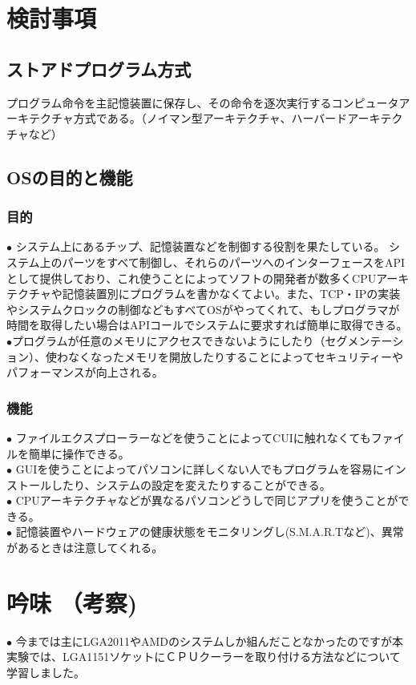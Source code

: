 \documentclass[10pt]{article}
\begin{document}
\section{検討事項}
\subsection{ストアドプログラム方式}
\hspace{1cm} プログラム命令を主記憶装置に保存し、その命令を逐次実行するコンピュータアーキテクチャ方式である。（ノイマン型アーキテクチャ、ハーバードアーキテクチャなど）
\subsection{OSの目的と機能}
\subsubsection{目的}
$\bullet$ システム上にあるチップ、記憶装置などを制御する役割を果たしている。 システム上のパーツをすべて制御し、それらのパーツへのインターフェースをAPIとして提供しており、これ使うことによってソフトの開発者が数多くCPUアーキテクチャや記憶装置別にプログラムを書かなくてよい。また、TCP・IPの実装やシステムクロックの制御などもすべてOSがやってくれて、もしプログラマが時間を取得したい場合はAPIコールでシステムに要求すれば簡単に取得できる。\\
$\bullet$プログラムが任意のメモリにアクセスできないようにしたり（セグメンテーション）、使わなくなったメモリを開放したりすることによってセキュリティーやパフォーマンスが向上される。

\subsubsection{機能}
$\bullet$ ファイルエクスプローラーなどを使うことによってCUIに触れなくてもファイルを簡単に操作できる。\\
$\bullet$ GUIを使うことによってパソコンに詳しくない人でもプログラムを容易にインストールしたり、システムの設定を変えたりすることができる。\\
$\bullet$ CPUアーキテクチャなどが異なるパソコンどうしで同じアプリを使うことができる。\\
$\bullet$ 記憶装置やハードウェアの健康状態をモニタリングし(S.M.A.R.Tなど)、異常があるときは注意してくれる。

\section{吟味 （考察)}
$\bullet$ 今までは主にLGA2011やAMDのシステムしか組んだことなかったのですが本実験では、LGA1151ソケットにＣＰＵクーラーを取り付ける方法などについて学習しました。
\end{document}
